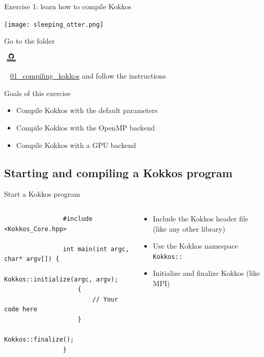 \documentclass[aspectratio=169]{beamer}
\newcommand{\githublink}[2][2em]{%
    \hspace{-0.25em}%
    \parbox[c][#1][c]{#1}{%
        \includegraphics[width=#1]{GitHub-logo.png}%
    }%
    \hspace{-0.25em}%
    ~%
    #2%
}
\begin{document}
\begin{frame}{Exercise 1: learn how to compile Kokkos}
    \begin{center}
    \texttt{[image: sleeping\_otter.png]}
    \end{center}

    Go to the folder \githublink{\href{https://github.com/CExA-project/cexa-kokkos-tutorials/tree/main/exercises/01_compiling_kokkos}{01\_compiling\_kokkos}} and follow the instructions

    \begin{block}{Goals of this exercise}
        \begin{itemize}
            \item Compile Kokkos with the default parameters
            \item Compile Kokkos with the OpenMP backend
            \item Compile Kokkos with a GPU backend
        \end{itemize}
    \end{block}
\end{frame}


\subsection[Starting a Kokkos program]{Starting and compiling a Kokkos program}


\begin{frame}[fragile]{Start a Kokkos program}
    \begin{columns}
        \begin{column}{0.6\linewidth}
            \begin{verbatim}
                #include <Kokkos_Core.hpp>

                int main(int argc, char* argv[]) {
                    Kokkos::initialize(argc, argv);
                    {
                        // Your code here
                    }
                    Kokkos::finalize();
                }
            \end{verbatim}
        \end{column}
        \begin{column}{0.4\linewidth}
            \begin{itemize}
                \item Include the Kokkos header file (like any other library)
                \item Use the Kokkos namespace \texttt{Kokkos::}
                \item Initialize and finalize Kokkos (like MPI)
            \end{itemize}
        \end{column}
    \end{columns}
\end{frame}
\end{document}
